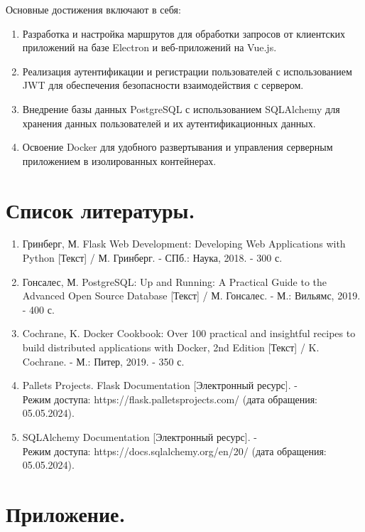 \documentclass[12pt, russian]{extarticle}
\begin{document}
\begin{spacing}{1.5}
    Основные достижения включают в себя:

    \begin{enumerate}
        \item Разработка и настройка маршрутов для обработки запросов от клиентских приложений
            на базе Electron и веб-приложений на Vue.js.
        \item Реализация аутентификации и регистрации пользователей с использованием JWT
            для обеспечения безопасности взаимодействия с сервером.
        \item Внедрение базы данных PostgreSQL с использованием SQLAlchemy для хранения
            данных пользователей и их аутентификационных данных.
        \item Освоение Docker для удобного развертывания и управления серверным приложением
            в изолированных контейнерах.
    \end{enumerate}

    \newpage
    \section{Список литературы.}

    \begin{enumerate}
        \item Гринберг, М. Flask Web Development: Developing Web Applications with Python [Текст] / М. Гринберг. - СПб.: Наука, 2018. - 300 с.
        \item Гонсалес, М. PostgreSQL: Up and Running: A Practical Guide to the Advanced Open Source Database [Текст] / М. Гонсалес. - М.: Вильямс, 2019. - 400 с.
        \item Cochrane, K. Docker Cookbook: Over 100 practical and insightful recipes to build distributed applications with Docker, 2nd Edition [Текст] / K. Cochrane. - М.: Питер, 2019. - 350 с.
        \item Pallets Projects. Flask Documentation [Электронный ресурс]. - \\
            Режим доступа: https://flask.palletsprojects.com/ (дата обращения: 05.05.2024).
        \item SQLAlchemy Documentation [Электронный ресурс]. - \\
            Режим доступа: https://docs.sqlalchemy.org/en/20/ (дата обращения: 05.05.2024).
    \end{enumerate}

    \newpage
    \section{Приложение.}

    

    \end{spacing}
\end{document}
